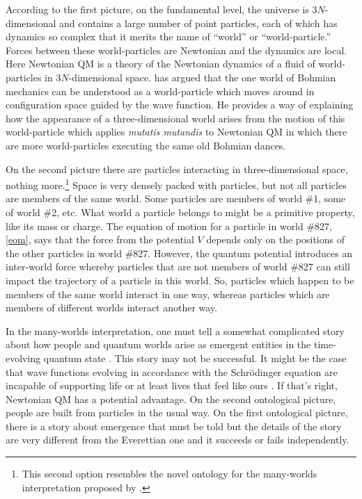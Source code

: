 \documentclass[12pt,secnumarabic,balancelastpage,amsmath,amssymb,nofootinbib]{article}
\begin{document}
According to the first picture, on the fundamental level, the universe is 3$N$-dimensional and contains a large number of point particles, each of which has dynamics so complex that it merits the name of ``world'' or ``world-particle.''  Forces between these world-particles are Newtonian and the dynamics are local.  Here Newtonian QM is a theory of the Newtonian dynamics of a fluid of world-particles in 3$N$-dimensional space.  \citet{albert1996} has argued that the one world of Bohmian mechanics can be understood as a world-particle which moves around in configuration space guided by the wave function.  He provides a way of explaining how the appearance of a three-dimensional world arises from the motion of this world-particle which applies \emph{mutatis mutandis} to Newtonian QM in which there are more world-particles executing the same old Bohmian dances.

On the second picture there are particles interacting in three-dimensional space, nothing more.\footnote{This second option resembles the novel ontology for the many-worlds interpretation proposed by \citet{allori2011}.}  Space is very densely packed with particles, but not all particles are members of the same world.  Some particles are members of world \#1, some of world \#2, etc.  What world a particle belongs to might be a primitive property, like its mass or charge.  The equation of motion for a particle in world \#827, \eqref{eom}, says that the force from the potential $V$ depends only on the positions of the other particles in world \#827.  However, the quantum potential introduces an inter-world force whereby particles that are not members of world \#827 can still impact the trajectory of a particle in this world.  So, particles which happen to be members of the same world interact in one way, whereas particles which are members of different worlds interact another way. 
 
In the many-worlds interpretation, one must tell a somewhat complicated story about how people and quantum worlds arise as emergent entities in the time-evolving quantum state \citep[e.g.,][]{wallace2003}.  This story may not be successful.  It might be the case that wave functions evolving in accordance with the Schr\"{o}dinger equation are incapable of supporting life or at least lives that feel like ours \citep{maudlin2010}.  If that's right, Newtonian QM has a potential advantage.  On the second ontological picture, people are built from particles in the usual way.  On the first ontological picture, there is a story about emergence that must be told but the details of the story are very different from the Everettian one and it succeeds or fails independently.
\end{document}
